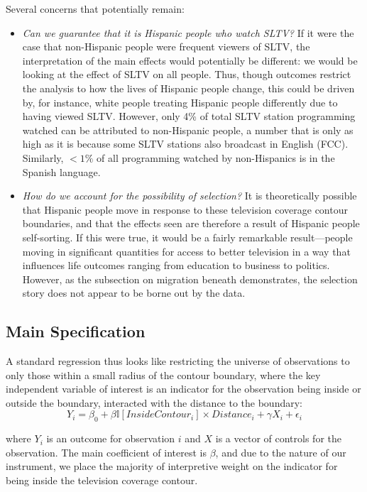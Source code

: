 \documentclass[11pt]{article}
\begin{document}
Several concerns that potentially remain:
\begin{itemize}
\item \textit{Can we guarantee that it is Hispanic people who watch SLTV?} If it were the case that non-Hispanic people were frequent viewers of SLTV, the interpretation of the main effects would potentially be different: we would be looking at the effect of SLTV on all people. Thus, though outcomes restrict the analysis to how the lives of Hispanic people change, this could be driven by, for instance, white people treating Hispanic people differently due to having viewed SLTV. However, only 4\% of total SLTV station programming watched can be attributed to non-Hispanic people, a number that is only as high as it is because some SLTV stations also broadcast in English  (FCC\cite{noauthor_hispanic_2016}). Similarly, $<1\%$ of all programming watched by non-Hispanics is in the Spanish language.

\item \textit{How do we account for the possibility of selection?} It is theoretically possible that Hispanic people move in response to these television coverage contour boundaries, and that the effects seen are therefore a result of Hispanic people self-sorting. If this were true, it would be a fairly remarkable result---people moving in significant quantities for access to better television in a way that influences life outcomes ranging from education to business to politics. However, as the subsection on migration beneath demonstrates, the selection story does not appear to be borne out by the data.
\end{itemize}

\subsection{Main Specification}

A standard regression thus looks like restricting the universe of observations to only those within a small radius of the contour boundary, where the key independent variable of interest is an indicator for the observation being inside or outside the boundary, interacted with the distance to the boundary:
\[ Y_i^{} = \beta_0 + \beta \mathbb{I}[InsideContour_i] \times Distance_i + \gamma X_i + \epsilon_i \]

where $Y_i$ is an outcome for observation $i$ and $X$ is a vector of controls for the observation. The main coefficient of interest is $\beta$, and due to the nature of our instrument, we place the majority of interpretive weight on the indicator for being inside the television coverage contour. 
\end{document}
